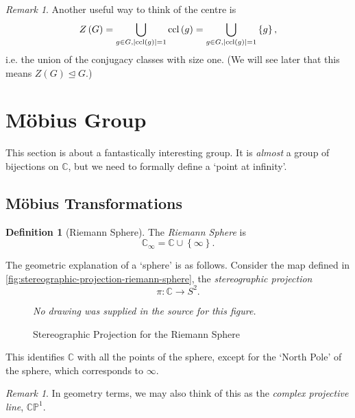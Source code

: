 \documentclass{article}
\theoremstyle{definition}
\newtheorem{definition}[theorem]{Definition}
\theoremstyle{remark}
\newtheorem{remark}[theorem]{Remark}
\DeclarePairedDelimiter{\abs}{\lvert}{\rvert}
\newcommand{\pqty}[1]{\left(#1\right)}
\newcommand{\Bqty}[1]{\left\{#1\right\}}
\newcommand{\functiondomain}[3]{#1:#2\to #3}
\newcommand{\normalsub}{\trianglelefteq}
\newcommand{\CC}{\mathbb{C}}
\newcommand{\ccl}{\operatorname{ccl}}
\newcommand{\compactify}{_{\infty}}
\newcommand{\CP}{\mathbb{CP}}
\begin{document}
\begin{remark}
    Another useful way to think of the centre is
    \[
        Z\pqty{G} = \bigcup_{g \in G, \abs{\ccl\pqty{g}} = 1} \ccl\pqty{g} = \bigcup_{g \in G, \abs{\ccl\pqty{g}} = 1} \Bqty{g},
    \]
    i.e. the union of the conjugacy classes with size one. (We will see later that this means \(Z\pqty{G} \normalsub G\).)
\end{remark}

\section{M\"{o}bius Group}
\label{sec:mobius-group}

This section is about a fantastically interesting group. It is \emph{almost} a group of bijections on \(\CC\), but we need to formally define a `point at infinity'.

\subsection{M\"{o}bius Transformations}

\begin{definition}[Riemann Sphere]
    \label{def:riemann-sphere}%
    The \emph{Riemann Sphere} is
    \[
        \CC\compactify = \CC \cup \Bqty{\infty}.
    \]
\end{definition}

The geometric explanation of a `sphere' is as follows. Consider the map defined in \autoref{fig:stereographic-projection-riemann-sphere}, the \emph{stereographic projection}
\[
    \functiondomain{\pi}{\CC}{S^2}.
\]

\begin{figure}[ht!]
    \centering
    \emph{No drawing was supplied in the source for this figure.}\par
\caption{Stereographic Projection for the Riemann Sphere}
    \label{fig:stereographic-projection-riemann-sphere}
\end{figure}

This identifies \(\CC\) with all the points of the sphere, except for the `North Pole' of the sphere, which corresponds to \(\infty\).

\begin{remark}
    In geometry terms, we may also think of this as the \emph{complex projective line}, \(\CP^{1}\).
\end{remark}
\end{document}
